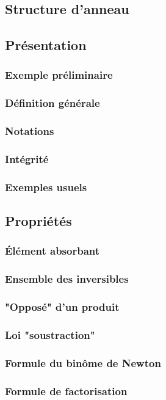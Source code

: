 \documentclass[12pt,a4paper,french]{book}
\begin{document}
\begin{spacing}{1.0}
	\section{Structure d'anneau}
		\subsection{Présentation}
			\subsubsection{Exemple préliminaire}
			\subsubsection{Définition générale}
			\subsubsection{Notations}
			\subsubsection{Intégrité}
			\subsubsection{Exemples usuels}
		\subsection{Propriétés}
			\subsubsection{Élément absorbant}
			\subsubsection{Ensemble des inversibles}
			\subsubsection{"Opposé" d'un produit}
			\subsubsection{Loi "soustraction"}
			\subsubsection{Formule du binôme de Newton}
			\subsubsection{Formule de factorisation}

\end{spacing}
\end{document}
